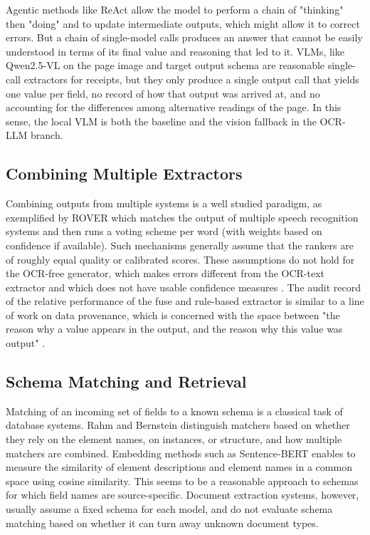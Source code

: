 \documentclass[conference]{IEEEtran}
\begin{document}
Agentic methods like ReAct \cite{react2023} allow the model to perform a chain of "thinking" then "doing" and to update intermediate outputs, which might allow it to correct errors. But a chain of single-model calls produces an answer that cannot be easily understood in terms of its final value and reasoning that led to it. VLMs, like Qwen2.5-VL \cite{bai2025qwen25vl} on the page image and target output schema are reasonable single-call extractors for receipts, but they only produce a single output call that yields one value per field, no record of how that output was arrived at, and no accounting for the differences among alternative readings of the page. In this sense, the local VLM is both the baseline and the vision fallback in the OCR-LLM branch.

\subsection{Combining Multiple Extractors}

Combining outputs from multiple systems is a well studied paradigm, as exemplified by ROVER \cite{fiscus1997rover} which matches the output of multiple speech recognition systems and then runs a voting scheme per word (with weights based on confidence if available). Such mechanisms generally assume that the rankers are of roughly equal quality or calibrated scores. These assumptions do not hold for the OCR-free generator, which makes errors different from the OCR-text extractor and which does not have usable confidence measures \cite{guo2017calibration}. The audit record of the relative performance of the fuse and rule-based extractor is similar to a line of work on data provenance, which is concerned with the space between "the reason why a value appears in the output, and the reason why this value was output" \cite{buneman2001provenance}.

\subsection{Schema Matching and Retrieval}

Matching of an incoming set of fields to a known schema is a classical task of database systems. Rahm and Bernstein \cite{rahm2001schema} distinguish matchers based on whether they rely on the element names, on instances, or structure, and how multiple matchers are combined. Embedding methods such as Sentence-BERT \cite{reimers2019sbert} enables to measure the similarity of element descriptions and element names in a common space using cosine similarity. This seems to be a reasonable approach to schemas for which field names are source-specific. Document extraction systems, however, usually assume a fixed schema for each model, and do not evaluate schema matching based on whether it can turn away unknown document types.
\end{document}
